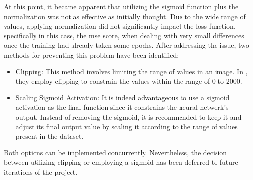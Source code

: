 At this point, it became apparent that utilizing the sigmoid function plus the normalization was not as effective as initially thought. Due to the wide range of values, applying normalization did not significantly impact the loss function, specifically in this case, the \gls{mse} score, when dealing with very small differences once the training had already taken some epochs. After addressing the issue, two methods for preventing this problem have been identified:
\begin{itemize}
	\item Clipping: This method involves limiting the range of values in an image. In \cite{Meraner2020}, they employ clipping to constrain the values within the range of 0 to 2000.
	\item Scaling Sigmoid Activation: It is indeed advantageous to use a sigmoid activation as the final function since it constrains the neural network's output. Instead of removing the sigmoid, it is recommended to keep it and adjust its final output value by scaling it according to the range of values present in the dataset.
\end{itemize}
Both options can be implemented concurrently. Nevertheless, the decision between utilizing clipping or employing a sigmoid has been deferred to future iterations of the project.
